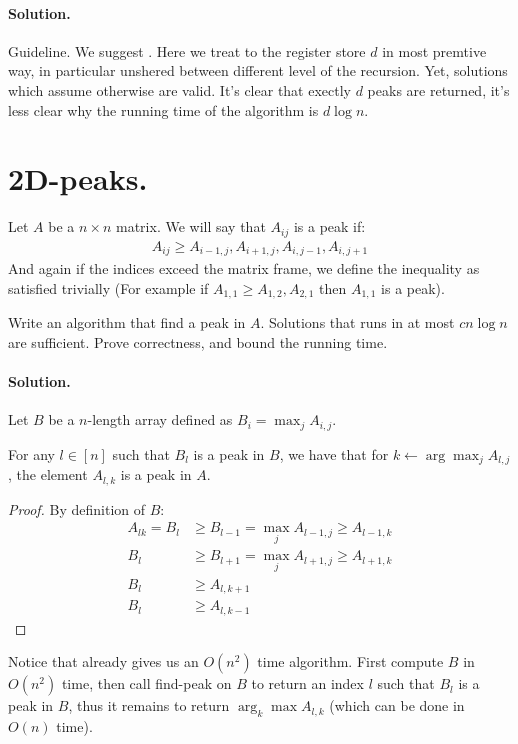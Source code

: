 \paragraph{Solution.} Guideline. We suggest . Here we treat to the register store $d$ in most premtive way, in particular unshered between different level of the recursion. Yet, solutions which assume otherwise are valid. It's clear that exectly $d$ peaks are returned, it's less clear why the running time of the algorithm is $d\log n$. 
\fi
\fi

  
\section{2D-peaks.} Let $A$ be a $n\times n$ matrix. We will say that $A_{ij}$ is a peak if: 
\begin{equation*}
  \begin{split}
    A_{ij} \ge A_{i-1,j}, A_{i+1,j}, A_{i,j-1}, A_{i,j+1}
  \end{split}
\end{equation*} 
And again if the indices exceed the matrix frame, we define the inequality as satisfied trivially (For example if $A_{1,1} \ge A_{1,2}, A_{2,1}$ then $A_{1,1}$ is a peak).

Write an algorithm that find a peak in $A$. Solutions that runs in at most $c n\log n $ are sufficient. Prove correctness, and bound the running time. 

\ifdefined\SOLUTION
  \newpage
  \paragraph{Solution.} Let $B$ be a $n$-length array defined as $B_{i} = \max_{j}{A_{i,j}}$.
  \begin{claim}
    \label{claim:maxA}
    For any $l \in [n]$ such that $B_l$ is a peak in $B$, we have that for $k \leftarrow \arg \max_{j} A_{l,j}$, the element $A_{l,k}$ is a peak in $A$.
\end{claim}

\begin{proof}
By definition of $B$:
  \begin{equation*}
    \begin{split}
      A_{lk} = B_{l} & \ge B_{l-1} = \max_{j}{A_{l-1,j}} \ge A_{l-1,k}\\
               B_{l} & \ge  B_{l+1} = \max_{j}{A_{l+1,j}}  \ge A_{l+1,k}\\
               B_{l} & \ge A_{l,k+1}\\
               B_{l} & \ge A_{l,k-1} 
    \end{split}
  \end{equation*}
\end{proof}
Notice that  already gives us an $O(n^2)$ time algorithm. First compute $B$ in $O(n^2)$ time, then call find-peak on $B$ to return an index $l$ such that $B_l$ is a peak in $B$, thus it remains to return $\arg_k \max A_{l,k}$ (which can be done in $O(n)$ time). 



